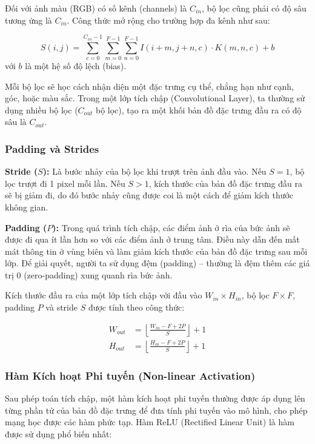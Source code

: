 Đối với ảnh màu (RGB) có số kênh (channels) là $C_{in}$, bộ lọc cũng phải có độ sâu tương ứng là $C_{in}$. Công thức mở rộng cho trường hợp đa kênh như sau:

\begin{equation}
    S(i, j) = \sum_{c=0}^{C_{in}-1} \sum_{m=0}^{F-1} \sum_{n=0}^{F-1} I(i+m, j+n, c) \cdot K(m, n, c) + b
\end{equation}
với $b$ là một hệ số độ lệch (bias).

Mỗi bộ lọc sẽ học cách nhận diện một đặc trưng cụ thể, chẳng hạn như cạnh, góc, hoặc màu sắc. Trong một lớp tích chập (Convolutional Layer), ta thường sử dụng nhiều bộ lọc ($C_{out}$ bộ lọc), tạo ra một khối bản đồ đặc trưng đầu ra có độ sâu là $C_{out}$.

\subsubsection{Padding và Strides}

\textbf{Stride ($S$):} Là bước nhảy của bộ lọc khi trượt trên ảnh đầu vào. Nếu $S=1$, bộ lọc trượt đi 1 pixel mỗi lần. Nếu $S>1$, kích thước của bản đồ đặc trưng đầu ra sẽ bị giảm đi, do đó bước nhảy cũng được coi là một cách để giảm kích thước không gian.

\textbf{Padding ($P$):} Trong quá trình tích chập, các điểm ảnh ở rìa của bức ảnh sẽ được đi qua ít lần hơn so với các điểm ảnh ở trung tâm. Điều này dẫn đến mất mát thông tin ở vùng biên và làm giảm kích thước của bản đồ đặc trưng sau mỗi lớp. Để giải quyết, người ta sử dụng đệm (padding) – thường là đệm thêm các giá trị $0$ (zero-padding) xung quanh rìa bức ảnh.

Kích thước đầu ra của một lớp tích chập với đầu vào $W_{in} \times H_{in}$, bộ lọc $F \times F$, padding $P$ và stride $S$ được tính theo công thức:

\begin{align}
    W_{out} &= \left\lfloor \frac{W_{in} - F + 2P}{S} \right\rfloor + 1 \\
    H_{out} &= \left\lfloor \frac{H_{in} - F + 2P}{S} \right\rfloor + 1
\end{align}

\subsubsection{Hàm Kích hoạt Phi tuyến (Non-linear Activation)}

Sau phép toán tích chập, một hàm kích hoạt phi tuyến thường được áp dụng lên từng phần tử của bản đồ đặc trưng để đưa tính phi tuyến vào mô hình, cho phép mạng học được các hàm phức tạp. Hàm ReLU (Rectified Linear Unit) là hàm được sử dụng phổ biến nhất:

